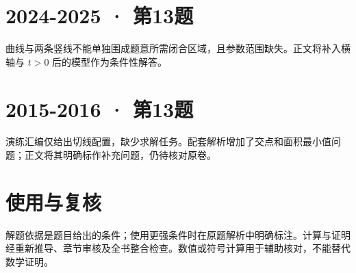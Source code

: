 \documentclass[UTF8,fontset=fandol,12pt,oneside,openany]{ctexrep}
\theoremstyle{definition}
\begin{document}
\section*{2024-2025 · 第13题}

曲线与两条竖线不能单独围成题意所需闭合区域，且参数范围缺失。正文将补入横轴与 $t>0$ 后的模型作为条件性解答。

\section*{2015-2016 · 第13题}

演练汇编仅给出切线配置，缺少求解任务。配套解析增加了交点和面积最小值问题；正文将其明确标作补充问题，仍待核对原卷。

\section*{使用与复核}

解题依据是题目给出的条件；使用更强条件时在原题解析中明确标注。计算与证明经重新推导、章节审核及全书整合检查。数值或符号计算用于辅助核对，不能替代数学证明。
\end{document}
